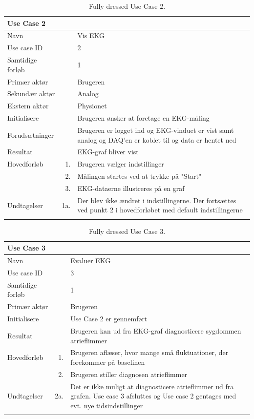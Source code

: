 \begin{longtabu} to  %
    {\large \textbf{Use Case 2}} && \\
    \toprule
    Navn &&    Vis EKG\\
    Use case ID &&    2\\
    Samtidige forløb &&    1\\
    Primær aktør &&    Brugeren\\
    Sekundær aktør &&	Analog\\
    Ekstern aktør &&	Physionet\\
    Initialisere &&    Brugeren ønsker at foretage en EKG-måling\\
    Forudsætninger &&    Brugeren er logget ind og EKG-vinduet er vist samt analog og DAQ'en er koblet til og data er hentet ned\\
    Resultat &&    EKG-graf bliver vist           \\ \midrule
    Hovedforløb &    1. &    Brugeren vælger indstillinger\\[-1ex]	
                &    2. &    Målingen startes ved at trykke på "Start"\\[-1ex]
                &    3. &    EKG-dataerne illustreres på en graf\\ \midrule
                
    Undtagelser &    1a. &    Der blev ikke ændret i indstillingerne. Der fortsættes ved punkt 2 i hovedforløbet med default indstillingerne \\ \bottomrule
\caption{Fully dressed Use Case 2.}
\label{UC2}
\end{longtabu}

\begin{longtabu} to  %
    {\large \textbf{Use Case 3}} && \\
    \toprule
    Navn &&    Evaluer EKG\\
    Use case ID &&    3\\
    Samtidige forløb &&    1\\
    Primær aktør &&    Brugeren\\
    Initialisere &&    Use Case 2 er gennemført   \\
    Resultat &&   Brugeren kan ud fra EKG-graf diagnosticere sygdommen atrieflimmer  \\ \midrule
    Hovedforløb &    1. &    Brugeren aflæser, hvor mange små fluktuationer, der forekommer på baselinen \\[-1ex]	
                &    2. &    Brugeren stiller diagnosen atrieflimmer\\ \midrule
                
    Undtagelser &    2a. &    Det er ikke muligt at diagnosticere atrieflimmer ud fra grafen. Use case 3 afsluttes og Use case 2 gentages med evt. nye tidsindstillinger \\ \bottomrule
\caption{Fully dressed Use Case 3.}
\label{UC3}
\end{longtabu}

